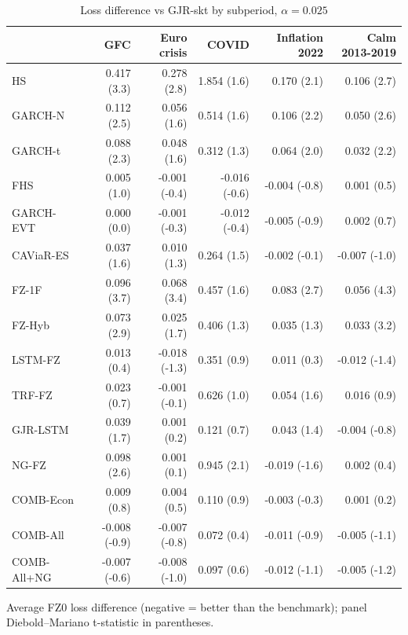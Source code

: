 \begin{table}[htbp]
\centering
\footnotesize
\caption{Loss difference vs GJR-skt by subperiod, $\alpha=0.025$}
\label{tab:sub}
\begin{tabular}{lrrrrr}
\toprule
 & GFC & Euro crisis & COVID & Inflation 2022 & Calm 2013-2019 \\
\midrule
HS & 0.417 (3.3) & 0.278 (2.8) & 1.854 (1.6) & 0.170 (2.1) & 0.106 (2.7) \\
GARCH-N & 0.112 (2.5) & 0.056 (1.6) & 0.514 (1.6) & 0.106 (2.2) & 0.050 (2.6) \\
GARCH-t & 0.088 (2.3) & 0.048 (1.6) & 0.312 (1.3) & 0.064 (2.0) & 0.032 (2.2) \\
FHS & 0.005 (1.0) & -0.001 (-0.4) & -0.016 (-0.6) & -0.004 (-0.8) & 0.001 (0.5) \\
GARCH-EVT & 0.000 (0.0) & -0.001 (-0.3) & -0.012 (-0.4) & -0.005 (-0.9) & 0.002 (0.7) \\
CAViaR-ES & 0.037 (1.6) & 0.010 (1.3) & 0.264 (1.5) & -0.002 (-0.1) & -0.007 (-1.0) \\
FZ-1F & 0.096 (3.7) & 0.068 (3.4) & 0.457 (1.6) & 0.083 (2.7) & 0.056 (4.3) \\
FZ-Hyb & 0.073 (2.9) & 0.025 (1.7) & 0.406 (1.3) & 0.035 (1.3) & 0.033 (3.2) \\
LSTM-FZ & 0.013 (0.4) & -0.018 (-1.3) & 0.351 (0.9) & 0.011 (0.3) & -0.012 (-1.4) \\
TRF-FZ & 0.023 (0.7) & -0.001 (-0.1) & 0.626 (1.0) & 0.054 (1.6) & 0.016 (0.9) \\
GJR-LSTM & 0.039 (1.7) & 0.001 (0.2) & 0.121 (0.7) & 0.043 (1.4) & -0.004 (-0.8) \\
NG-FZ & 0.098 (2.6) & 0.001 (0.1) & 0.945 (2.1) & -0.019 (-1.6) & 0.002 (0.4) \\
COMB-Econ & 0.009 (0.8) & 0.004 (0.5) & 0.110 (0.9) & -0.003 (-0.3) & 0.001 (0.2) \\
COMB-All & -0.008 (-0.9) & -0.007 (-0.8) & 0.072 (0.4) & -0.011 (-0.9) & -0.005 (-1.1) \\
COMB-All+NG & -0.007 (-0.6) & -0.008 (-1.0) & 0.097 (0.6) & -0.012 (-1.1) & -0.005 (-1.2) \\
\bottomrule
\end{tabular}
\par\smallskip\parbox{\linewidth}{\scriptsize Average FZ0 loss difference (negative = better than the benchmark); panel Diebold--Mariano t-statistic in parentheses.}
\end{table}